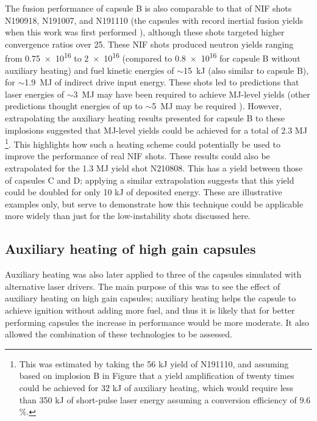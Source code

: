 The fusion performance of capsule B is also comparable to that of NIF shots N190918, N191007, and N191110 (the capsules with record inertial fusion yields when this work was first performed \cite{Zylstra2021}), although these shots targeted higher convergence ratios over 25. These NIF shots produced neutron yields ranging from \num{0.75e16} to \num{2e16} (compared to \num{0.8e16} for capsule B without auxiliary heating) and fuel kinetic energies of $\sim$15~kJ (also similar to capsule B), for $\sim$1.9~MJ of indirect drive input energy. These shots led to predictions that laser energies of $\sim$3~MJ \cite{Zylstra2021} may have been required to achieve MJ-level yields (other predictions thought energies of up to $\sim$5~MJ may be required \cite{Zylstra2021, Cheng2021}). However, extrapolating the auxiliary heating results presented for capsule B to these implosions suggested that MJ-level yields could be achieved for a total of 2.3 MJ \footnote{This was estimated by taking the 56 kJ yield of N191110, and assuming based on implosion B in Figure \label{fig:HeatingPower} that a yield amplification of twenty times could be achieved for 32 kJ of auxiliary heating, which would require less than 350 kJ of short-pulse laser energy assuming a conversion efficiency of 9.6 \%.}. This highlights how such a heating scheme could potentially be used to improve the performance of real NIF shots. These results could also be extrapolated for the 1.3 MJ yield shot N210808. This has a yield between those of capsules C and D; applying a similar extrapolation suggests that this yield could be doubled for only 10 kJ of deposited energy. These are illustrative examples only, but serve to demonstrate how this technique could be applicable more widely than just for the low-instability shots discussed here.

\subsection{Auxiliary heating of high gain capsules}
Auxiliary heating was also later applied to three of the capsules simulated with alternative laser drivers. The main purpose of this was to see the effect of auxiliary heating on high gain capsules; auxiliary heating helps the capsule to achieve ignition without adding more fuel, and thus it is likely that for better performing capsules the increase in performance would be more moderate. It also allowed the combination of these technologies to be assessed.

